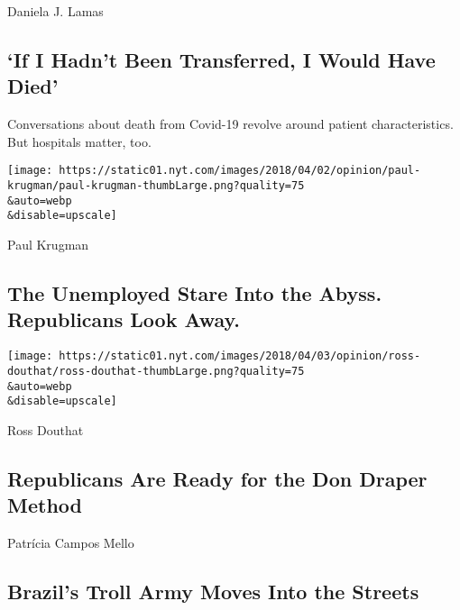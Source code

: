 \href{/2020/08/04/opinion/covid-rural-hospitals.html}{}

Daniela J. Lamas

\hypertarget{if-i-hadnt-been-transferred-i-would-have-died}{%
\subsection{`If I Hadn't Been Transferred, I Would Have
Died'}\label{if-i-hadnt-been-transferred-i-would-have-died}}

Conversations about death from Covid-19 revolve around patient
characteristics. But hospitals matter, too.

\href{/2020/08/03/opinion/republicans-unemployed-coronavirus.html}{}

\texttt{[image: https://static01.nyt.com/images/2018/04/02/opinion/paul-krugman/paul-krugman-thumbLarge.png?quality=75\\\&auto=webp\\\&disable=upscale]}

Paul Krugman

\hypertarget{the-unemployed-stare-into-the-abyss-republicans-look-away}{%
\subsection{The Unemployed Stare Into the Abyss. Republicans Look
Away.}\label{the-unemployed-stare-into-the-abyss-republicans-look-away}}

\href{/2020/08/04/opinion/trump-republicans-tea-party.html}{}

\texttt{[image: https://static01.nyt.com/images/2018/04/03/opinion/ross-douthat/ross-douthat-thumbLarge.png?quality=75\\\&auto=webp\\\&disable=upscale]}

Ross Douthat

\hypertarget{republicans-are-ready-for-the-don-draper-method}{%
\subsection{Republicans Are Ready for the Don Draper
Method}\label{republicans-are-ready-for-the-don-draper-method}}

\href{/2020/08/04/opinion/bolsonaro-office-of-hate-brazil.html}{}

Patrícia Campos Mello

\hypertarget{brazils-troll-army-moves-into-the-streets}{%
\subsection{Brazil's Troll Army Moves Into the
Streets}\label{brazils-troll-army-moves-into-the-streets}}

